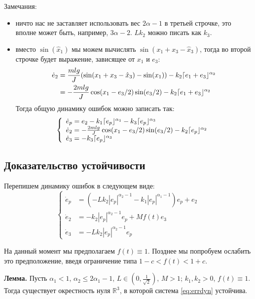 \documentclass{article}
\DeclarePairedDelimiter{\homd}{\lceil}{\rfloor}
\begin{document}
Замечания:
\begin{itemize}
\item ничто нас не заставляет использовать вес $2\alpha-1$ в третьей строчке, это вполне может быть, например, $3\alpha-2$. $L k_2$ можно писать как $k_3$.

\item вместо $\sin(\hat{x}_1)$ мы можем вычислять $\sin(x_1+x_3 -\hat{x}_3)$, тогда во второй строчке будет выражение, зависящее от $x_1$ и $e_3$:
\begin{align*}
\dot{e}_2 & = \frac{mlg}{J}(\sin(x_1+x_3 - \hat{x}_3) - \sin(x_1) ) - k_2\homd{e_1+e_3}^{\alpha_2}\\
          & = -\frac{2mlg}{J}\cos(x_1 - e_3/2)\sin(e_3/2) - k_2\homd{e_1+e_3}^{\alpha_2}\\
\end{align*}
Тогда общую динамику ошибок можно записать так:
$$
\left\{
\begin{array}{l}
\dot{e}_p = e_2 - k_1\homd{e_p}^{\alpha_1} - k_3\homd{e_p}^{\alpha_3} \\
\dot{e}_2 = -\frac{2mlg}{J}\cos(x_1 - e_3/2)\sin(e_3/2) - k_2\homd{e_p}^{\alpha_2}\\
\dot{e}_3 = -k_3\homd{e_p}^{\alpha_3}
\end{array}
\right.
$$



\end{itemize}

\newpage

\subsection{Доказательство устойчивости}

Перепишем динамику ошибок в следующем виде:
\begin{equation}
\label{eq:errdyn}
\left\{
\begin{aligned}
\dot e_p&=(-Lk_2|e_p|^{\alpha_2-1}-k_1|e_p|^{\alpha_1-1})e_p+e_2  \\
\dot e_2&= - k_2|e_p|^{\alpha_2-1}e_p+Mf(t)e_3\\
\dot e_3&=  -Lk_2|e_p|^{\alpha_2-1}e_p
\end{aligned}
\right.
\end{equation}

На данный момент мы предполагаем $f(t)\equiv 1$. Позднее мы попробуем ослабить это предположение, введя ограничение типа $1-c<f(t)<1+c$.



{\bf Лемма.} Пусть $\alpha_1<1$, $\alpha_2\leqslant2\alpha_1-1$, $L\in \left(0,\frac{1}{\sqrt{2}}\right)$, $M>1$; $k_1,k_2>0$, $f(t)\equiv 1$. 
Тогда существует окрестность нуля $\mathbb R^3$, в которой система \eqref{eq:errdyn} устойчива.
\end{document}
